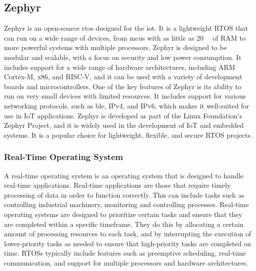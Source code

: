 \subsection{Zephyr}
Zephyr is an \gls{open-source} \gls{rtos} designed for the \gls{iot}. It is a lightweight RTOS that can run on a wide range of devices, from \gls{mcu}s with as little as \qty{20}{\kilo\byte} of RAM to more powerful systems with multiple processors. Zephyr is designed to be modular and scalable, with a focus on security and low power consumption. It includes support for a wide range of hardware architectures, including ARM Cortex-M, x86, and RISC-V, and it can be used with a variety of development boards and microcontrollers. One of the key features of Zephyr is its ability to run on very small devices with limited resources. It includes support for various networking protocols, such as \gls{ble}, IPv4, and IPv6, which makes it well-suited for use in IoT applications. Zephyr is developed as part of the Linux Foundation's Zephyr Project, and it is widely used in the development of IoT and embedded systems. It is a popular choice for lightweight, flexible, and secure RTOS projects.

\subsubsection{Real-Time Operating System}
A real-time operating system is an operating system that is designed to handle real-time applications. Real-time applications are those that require timely processing of data in order to function correctly. This can include tasks such as controlling industrial machinery, monitoring and controlling processes. Real-time operating systems are designed to prioritize certain tasks and ensure that they are completed within a specific timeframe. They do this by allocating a certain amount of processing resources to each task, and by interrupting the execution of lower-priority tasks as needed to ensure that high-priority tasks are completed on time. RTOSs typically include features such as preemptive scheduling, real-time communication, and support for multiple processors and hardware architectures.

